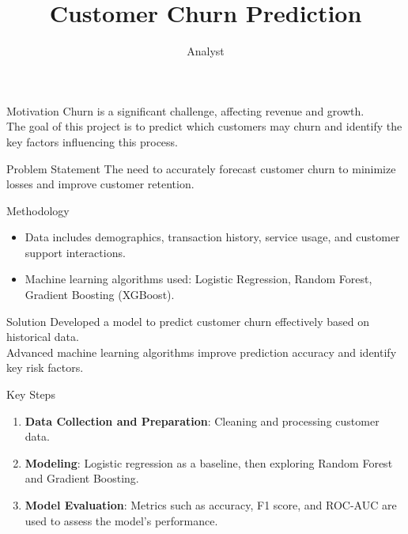 \documentclass{beamer}
\title{Customer Churn Prediction}
\author{Analyst}
\begin{document}
\begin{frame}
    \titlepage
\end{frame}

\begin{frame}{Motivation}
    Churn is a significant challenge, affecting revenue and growth. \\ The goal of this project is to predict which customers may churn and identify the key factors influencing this process.
\end{frame}

\begin{frame}{Problem Statement}
    The need to accurately forecast customer churn to minimize losses and improve customer retention.
\end{frame}

\begin{frame}{Methodology}
    \begin{itemize}
        \item Data includes demographics, transaction history, service usage, and customer support interactions.
        \item Machine learning algorithms used: Logistic Regression, Random Forest, Gradient Boosting (XGBoost).
    \end{itemize}
\end{frame}

\begin{frame}{Solution}
    Developed a model to predict customer churn effectively based on historical data. \\ Advanced machine learning algorithms improve prediction accuracy and identify key risk factors.
\end{frame}

\begin{frame}{Key Steps}
    \begin{enumerate}
        \item \textbf{Data Collection and Preparation}: Cleaning and processing customer data.
        \item \textbf{Modeling}: Logistic regression as a baseline, then exploring Random Forest and Gradient Boosting.
        \item \textbf{Model Evaluation}: Metrics such as accuracy, F1 score, and ROC-AUC are used to assess the model's performance.
    \end{enumerate}
\end{frame}
\end{document}
